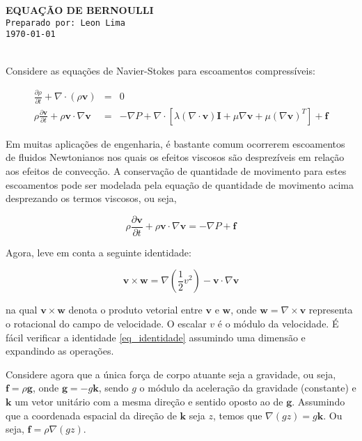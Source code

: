 \documentclass[a4paper,portuguese,10pt]{article}
\renewcommand{\div}{\nabla\cdot}
\newcommand{\grad}{\nabla}
\renewcommand{\D}{\partial}
\renewcommand{\vec}{\mathbf}
\begin{document}


\Large \color{NavyBlue} \textbf{EQUAÇÃO DE BERNOULLI}\\
\color{Black} %
\normalsize \texttt{Preparado por: Leon Lima}\\%
\normalsize \texttt{\today}
\vspace{-2mm}

\setcounter{tocdepth}{1}
\hrulefill\\

Considere as equações de Navier-Stokes para escoamentos compressíveis:

\begin{subequations}
\begin{eqnarray}
  \frac{\D\rho}{\D t} + \div(\rho\vec{v}) &=& 0\\
  \rho\frac{\D\vec{v}}{\D t}+\rho\vec{v}\cdot\grad\vec{v} &=& -\grad P + \div[\lambda(\div\vec{v})\vec{I} + \mu\grad\vec{v}+\mu(\grad\vec{v})^T] + \vec{f}
\end{eqnarray}
\label{eq_ns}
\end{subequations}

Em muitas aplicações de engenharia, é bastante comum ocorrerem escoamentos de fluidos Newtonianos nos quais os efeitos viscosos são desprezíveis em relação aos efeitos de convecção. A conservação de quantidade de movimento para estes escoamentos pode ser modelada pela equação de quantidade de movimento acima desprezando os termos viscosos, ou seja,

\begin{equation}
  \rho\frac{\D\vec{v}}{\D t}+\rho\vec{v}\cdot\grad\vec{v} = -\grad P + \vec{f}
\label{eq_qdm_inviscido}
\end{equation}

Agora, leve em conta a seguinte identidade:

\begin{equation}
  \vec{v}\times\vec{w} = \grad\left(\frac{1}{2}v^2\right) - \vec{v}\cdot\grad\vec{v}
  \label{eq_identidade}
\end{equation}

na qual $\vec{v}\times\vec{w}$ denota o produto vetorial entre $\vec{v}$ e $\vec{w}$, onde $\vec{w} = \nabla\times\vec{v}$ representa o rotacional do campo de velocidade. O escalar $v$ é o módulo da velocidade. É fácil verificar a identidade \ref{eq_identidade} assumindo uma dimensão e expandindo as operações.

Considere agora que a única força de corpo atuante seja a gravidade, ou seja,  $\vec{f} = \rho\vec{g}$, onde $\vec{g}=-g\vec{k}$, sendo $g$ o módulo da aceleração da gravidade (constante) e $\vec{k}$ um vetor unitário com a mesma direção e sentido oposto ao de $\vec{g}$. Assumindo que a coordenada espacial da direção de $\vec{k}$ seja $z$, temos que $\grad(gz) = g\vec{k}$. Ou seja, $\vec{f} = \rho\grad(gz)$.
\end{document}
